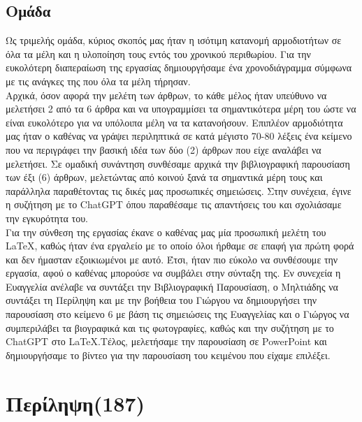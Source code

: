 \documentclass{report}
\begin{document}
\section{Ομάδα} 
Ως τριμελής ομάδα, κύριος σκοπός μας ήταν η ισότιμη κατανομή αρμοδιοτήτων σε όλα τα μέλη και η υλοποίηση τους εντός του χρονικού περιθωρίου. Για την ευκολότερη διαπεραίωση της εργασίας δημιουργήσαμε ένα χρονοδιάγραμμα σύμφωνα με τις ανάγκες της που όλα τα μέλη τήρησαν. \\
Αρχικά, όσον αφορά την μελέτη των άρθρων, το κάθε μέλος ήταν υπεύθυνο να μελετήσει 2 από τα 6 άρθρα και να υπογραμμίσει τα σημαντικότερα μέρη του ώστε να είναι ευκολότερο για να υπόλοιπα μέλη να τα κατανοήσουν. Επιπλέον αρμοδιότητα μας ήταν ο καθένας να γράψει περιληπτικά σε κατά μέγιστο 70-80 λέξεις ένα κείμενο που να περιγράφει την βασική ιδέα των δύο (2) άρθρων που είχε αναλάβει να μελετήσει. Σε ομαδική συνάντηση συνθέσαμε αρχικά την βιβλιογραφική παρουσίαση των έξι (6) άρθρων, μελετώντας από κοινού ξανά τα σημαντικά μέρη τους και παράλληλα παραθέτοντας τις δικές μας προσωπικές σημειώσεις. Στην συνέχεια, έγινε η συζήτηση με το ChatGPT όπου παραθέσαμε τις απαντήσεις του και σχολιάσαμε την εγκυρότητα του.\\
Για την σύνθεση της εργασίας έκανε ο καθένας μας μία προσωπική μελέτη του LaTeX,  καθώς ήταν ένα εργαλείο με το οποίο όλοι ήρθαμε σε επαφή για πρώτη φορά και δεν ήμασταν εξοικιωμένοι με αυτό. Έτσι, ήταν πιο εύκολο να συνθέσουμε την εργασία, αφού ο καθένας μπορούσε να συμβάλει στην σύνταξη της.
Εν συνεχεία η Ευαγγελία ανέλαβε να συντάξει την Βιβλιογραφική Παρουσίαση, ο Μηλτιάδης να συντάξει τη Περίληψη και με την βοήθεια του Γιώργου να δημιουργήσει την παρουσίαση στο κείμενο 6 με βάση τις σημειώσεις της Ευαγγελίας και ο Γιώργος να συμπεριλάβει τα βιογραφικά και τις φωτογραφίες, καθώς και την συζήτηση με το ChatGPT στο LaTeX.Τέλος, μελετήσαμε την παρουσίαση σε PowerPoint και δημιουργήσαμε το βίντεο για την παρουσίαση του κειμένου που είχαμε επιλέξει.

\chapter{Περίληψη(187)}
\end{document}
